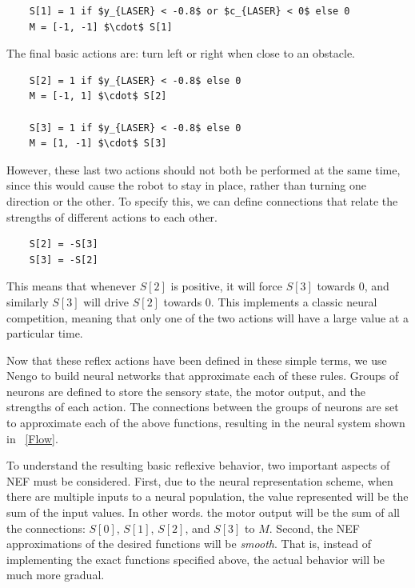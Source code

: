 \documentclass[conference]{IEEEtran}
\begin{document}
\begin{lstlisting}
	S[1] = 1 if $y_{LASER} < -0.8$ or $c_{LASER} < 0$ else 0
	M = [-1, -1] $\cdot$ S[1]
\end{lstlisting}

The final basic actions are: turn left or right when close to an obstacle. 

\begin{lstlisting}
	S[2] = 1 if $y_{LASER} < -0.8$ else 0
	M = [-1, 1] $\cdot$ S[2]

	S[3] = 1 if $y_{LASER} < -0.8$ else 0
	M = [1, -1] $\cdot$ S[3]
\end{lstlisting}

However, these last two actions should not both be performed at the same time,
since this would cause the robot to stay in place, rather than turning one
direction or the other. To specify this, we can define connections that relate 
the strengths of different actions to each other.

\begin{lstlisting}
	S[2] = -S[3]
	S[3] = -S[2]
\end{lstlisting}

This means that whenever $S[2]$ is positive, it will force $S[3]$ towards $0$, 
and similarly $S[3]$ will drive $S[2]$ towards $0$.  This implements a classic
neural competition, meaning that only one of the two actions will have a large
value at a particular time.

Now that these reflex actions have been defined in these simple terms, we use
Nengo to build neural networks that approximate each of these rules.  Groups
of neurons are defined to store the sensory state, the motor output, and the 
strengths of each action. The connections between the groups of neurons are 
set to approximate each of the above functions, resulting in the neural 
system shown in \figurename~\ref{Flow}. 

To understand the resulting basic reflexive behavior,
two important aspects of NEF must be considered. First, due to the neural 
representation scheme, when there are multiple inputs to a neural population, 
the value represented will be the sum of the input values. In other words. the 
motor output will be the sum of all the connections: $S[0]$, $S[1]$, $S[2]$, and $S[3]$ to $M$. 
Second, the NEF approximations of the desired functions will be \textit{smooth}. 
That is, instead of implementing the exact functions specified above, the 
actual behavior will be much more gradual. 
\end{document}
